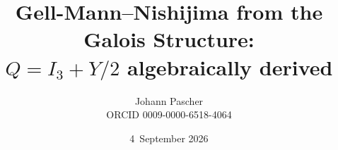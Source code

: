 \documentclass[11pt,a4paper]{report}
\title{Gell-Mann--Nishijima from the Galois Structure:\\[0.5em]
  \large $Q = I_3 + Y/2$ algebraically derived}
\date{4~September 2026}
\author{Johann Pascher\\\small ORCID 0009-0000-6518-4064}
\begin{document}
\renewcommand{\thechapter}{}
\renewcommand{\thesection}{\arabic{section}}
\maketitle
\tableofcontents

\end{document}
